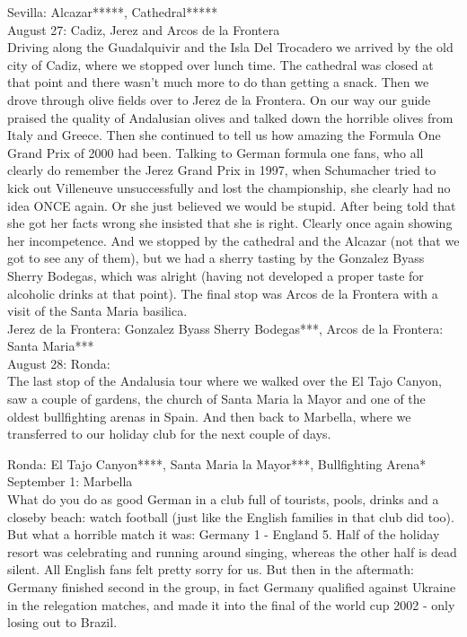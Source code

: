 Sevilla: Alcazar*****, Cathedral*****\\

August 27: Cadiz, Jerez and Arcos de la Frontera\\
Driving along the Guadalquivir and the Isla Del Trocadero we arrived by the old city of Cadiz, where we stopped over lunch time. The cathedral was closed at that point and there wasn't much more to do than getting a snack. Then we drove through olive fields over to Jerez de la Frontera. On our way our guide praised the quality of Andalusian olives and talked down the horrible olives from Italy and Greece. Then she continued to tell us how amazing the Formula One Grand Prix of 2000 had been. Talking to German formula one fans, who all clearly do remember the Jerez Grand Prix in 1997, when Schumacher tried to kick out Villeneuve unsuccessfully and lost the championship, she clearly had no idea ONCE again. Or she just believed we would be stupid. After being told that she got her facts wrong she insisted that she is right. Clearly once again showing her incompetence. And we stopped by the cathedral and the Alcazar (not that we got to see any of them), but we had a sherry tasting by the Gonzalez Byass Sherry Bodegas, which was alright (having not developed a proper taste for alcoholic drinks at that point). The final stop was Arcos de la Frontera with a visit of the Santa Maria basilica.\\

Jerez de la Frontera: Gonzalez Byass Sherry Bodegas***, Arcos de la Frontera: Santa Maria***\\

August 28: Ronda:\\
The last stop of the Andalusia tour where we walked over the El Tajo Canyon, saw a couple of gardens, the church of Santa Maria la Mayor and one of the oldest bullfighting arenas in Spain. And then back to Marbella, where we transferred to our holiday club for the next couple of days.

Ronda: El Tajo Canyon****,  Santa Maria la Mayor***, Bullfighting Arena*\\

September 1: Marbella\\
What do you do as good German in a club full of tourists, pools, drinks and a closeby beach: watch football (just like the English families in that club did too). But what a horrible match it was: Germany 1 - England 5. Half of the holiday resort was celebrating and running around singing, whereas the other half is dead silent. All English fans felt pretty sorry for us. But then in the aftermath: Germany finished second in the group, in fact Germany qualified against Ukraine in the relegation matches, and made it into the final of the world cup 2002 - only losing out to Brazil.